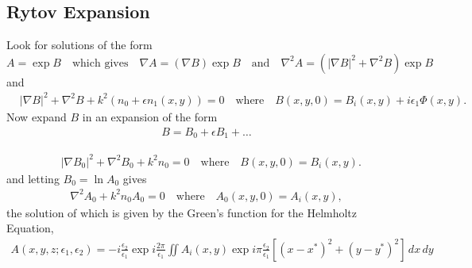  \subsection{Rytov Expansion}
 Look for solutions of the form
 \begin{equation}
   A = \exp{B} \quad \mbox{which gives} \quad \nabla A = \left(\nabla B\right) \exp{B} \quad
 \mbox{and} \quad \nabla^2 A = \left(\left|\nabla B \right|^2 + \nabla^2 B\right)\exp{B}
 \end{equation}
 and
 \begin{equation}\label{EQ:helmholtz_equation_3}
 \begin{split}
   &\left|\nabla B \right|^2 + \nabla^2 B + k^2  (n_0 + \epsilon n_1(x,y)) = 0 \quad  \mbox{where} \quad B(x,y,0) = B_{i}(x,y) + i \epsilon_{1} \Phi(x,y).
 \end{split}
 \end{equation}
 Now expand $B$ in an expansion of the form
 \begin{equation}
 \begin{split}
 B = B_{0} + \epsilon B_{1} + \dots
 \end{split}
 \end{equation}

 \begin{equation}\label{EQ:Order_1}
 \begin{split}
   &\left|\nabla B_{0} \right|^2 + \nabla^2 B_{0} + k^2 n_0 = 0 \quad  \mbox{where} \quad B(x,y,0) = B_{i}(x,y).
 \end{split}
 \end{equation}
 and letting $B_{0} = \ln{A_{0}}$ gives
 \begin{equation}
 \begin{split}
   \nabla^2 A_{0} + k^2n_0 A_{0} = 0  \quad  \mbox{where} \quad A_{0}(x,y,0) = A_{i}(x,y),
 \end{split}
 \end{equation}
 the solution of which is given by the Green's function for the Helmholtz Equation,
 \begin{equation}
 \begin{split}
 A(x,y,z;\epsilon_1,\epsilon_2) = - i  \frac{\epsilon_2}{\epsilon_1} \exp{i  \frac{2\pi}{\epsilon_1}}
 \iint A_{i}(x,y) \exp{i \pi  \frac{\epsilon_2}{\epsilon_1} \left[ \left(x-x^*\right)^2 + \left(y-y^*\right)^2  \right]} \, dx \, dy
 \end{split}
 \end{equation}
